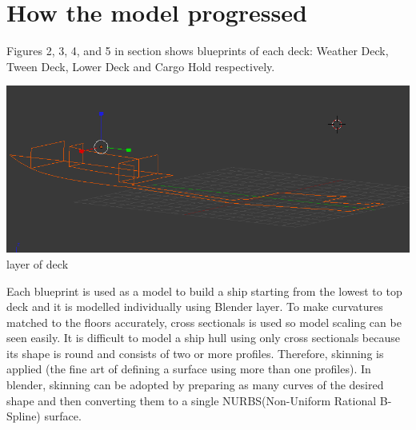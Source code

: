 \documentclass[a4paper,10pt]{article}
\begin{document}
\section{How the model progressed}
Figures 2, 3, 4, and 5 in section shows blueprints of each deck: Weather Deck, Tween Deck, Lower Deck and Cargo Hold respectively.
\begin{center}
\includegraphics[scale=0.5]{../images/deck.png}
\\layer of deck
\end{center}
Each blueprint is used as a model to build a ship starting from the lowest to top deck and it is modelled individually using Blender layer.
To make curvatures matched to the floors accurately, cross sectionals is used so model scaling can be seen easily.
It is difficult to model a ship hull using only cross sectionals because its shape is round and consists of two or more profiles.
Therefore, skinning is applied (the fine art of defining a surface using more than one profiles).
In blender, skinning can be adopted by preparing as many curves of the desired shape and then converting them to a single NURBS(Non-Uniform Rational B-Spline) 
surface.
\end{document}
